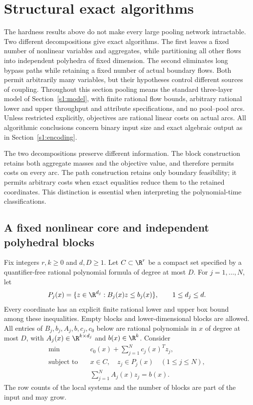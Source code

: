 \section{Structural exact algorithms}\label{s4:structural}

The hardness results above do not make every large pooling network
intractable. Two different decompositions give exact algorithms. The
first leaves a fixed number of nonlinear variables and aggregates, while
partitioning all other flows into independent polyhedra of fixed
dimension. The second eliminates long bypass paths while retaining a
fixed number of actual boundary flows. Both permit arbitrarily many
variables, but their hypotheses control different sources of coupling.
Throughout this section pooling means the standard three-layer model of
Section~\ref{s1:model}, with finite rational flow bounds, arbitrary
rational lower and upper throughput and attribute specifications, and
no pool--pool arcs. Unless restricted explicitly, objectives are rational
linear costs on actual arcs. All algorithmic conclusions concern binary
input size and exact algebraic output as in Section~\ref{s1:encoding}.

The two decompositions preserve different information. The block
construction retains both aggregate masses and the objective value,
and therefore permits costs on every arc. The path construction retains
only boundary feasibility; it permits arbitrary costs when exact
equalities reduce them to the retained coordinates. This distinction
is essential when interpreting the polynomial-time classifications.

\subsection{A fixed nonlinear core and independent polyhedral blocks}
\label{s4:core-model}

Fix integers $r,k\ge0$ and $d,D\ge1$. Let $C\subset\R^r$ be a compact
set specified by a quantifier-free rational polynomial formula of degree
at most $D$. For $j=1,\ldots,N$, let
\[
 P_j(x)=\{z\in\R^{d_j}:B_j(x)z\le b_j(x)\},\qquad 1\le d_j\le d.
\]
Every coordinate has an explicit finite rational lower and upper box
bound among these inequalities. Empty blocks and lower-dimensional
blocks are allowed. All entries of $B_j,b_j,A_j,b,c_j,c_0$ below are
rational polynomials in $x$ of degree at most $D$, with
$A_j(x)\in\R^{k\times d_j}$ and $b(x)\in\R^k$. Consider
\begin{equation}
 \begin{aligned}
 \min\quad &c_0(x)+\sum_{j=1}^N c_j(x)^Tz_j,\\
 \text{subject to}\quad &x\in C,\quad z_j\in P_j(x)\quad(1\le j\le N),\\
 &\sum_{j=1}^N A_j(x)z_j=b(x).
 \end{aligned}\label{s4:block-model}
\end{equation}
The row counts of the local systems and the number of blocks are part
of the input and may grow.

